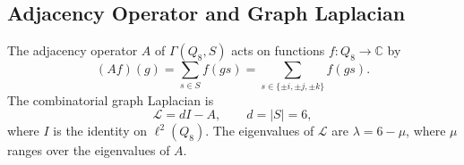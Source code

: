 \subsection{Adjacency Operator and Graph Laplacian}
  \label{subsec:adjacency-operator-graph-laplacian}

  The adjacency operator $A$ of $\Gamma(Q_8, S)$ acts on functions
  $f \colon Q_8 \to \mathbb{C}$ by
  \begin{equation}
    (Af)(g) = \sum_{s \in S} f(gs)
  = \sum_{s \in \{\pm i, \pm j, \pm k\}} f(gs).
  \end{equation}
  The combinatorial graph Laplacian is
  \begin{equation}
    \mathcal{L} = dI - A,
    \qquad
    d = |S| = 6,
  \end{equation}
  where $I$ is the identity on $\ell^2(Q_8)$.
  The eigenvalues of $\mathcal{L}$ are $\lambda = 6 - \mu$, where $\mu$ ranges over
  the eigenvalues of $A$.
